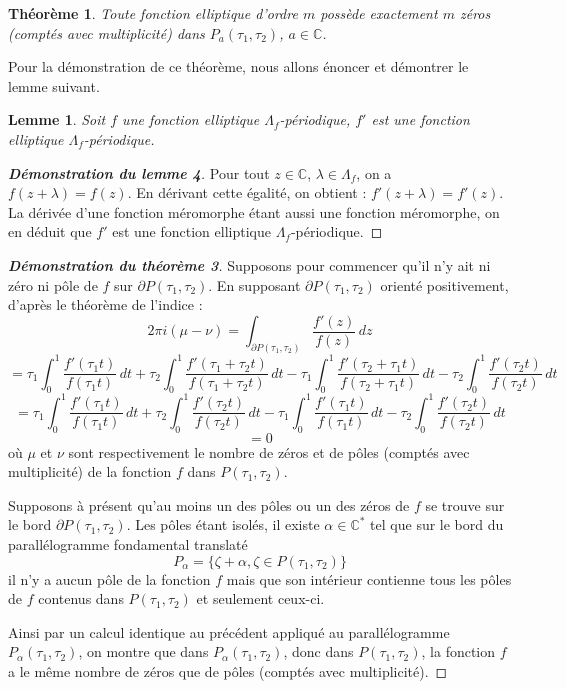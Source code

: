 \documentclass[12pt]{article}
\newtheorem{lemma}{Lemme}
\newtheorem{theorem}{Théorème}
\begin{document}
\begin{theorem}
    Toute fonction elliptique d'ordre \( m \) possède exactement \( m \) zéros (comptés avec multiplicité) dans \( P_{a}(\tau_1, \tau_2) \), \( a \in \mathbb{C} \).
    \end{theorem}
Pour la démonstration de ce théorème, nous allons énoncer et démontrer le lemme suivant.
    
    \begin{lemma}
    Soit \( f \) une fonction elliptique \( \Lambda_f \)-périodique, \( f' \) est une fonction elliptique \( \Lambda_f\)-périodique.
    \end{lemma}
    
    \begin{proof}[\textbf{Démonstration du lemme 4}]
    Pour tout \( z \in \mathbb{C} \), \( \lambda \in \Lambda_f \), on a \( f(z + \lambda) = f(z) \). En dérivant cette égalité, on obtient : \( f'(z + \lambda) = f'(z) \). La dérivée d'une fonction méromorphe étant aussi une fonction méromorphe, on en déduit que \( f' \) est une fonction elliptique \( \Lambda_f \)-périodique.
    \end{proof}
    
    \begin{proof}[\textbf{Démonstration du théorème 3}]
    Supposons pour commencer qu'il n'y ait ni zéro ni pôle de \( f \) sur \( \partial P(\tau_1, \tau_2) \). En supposant \( \partial P(\tau_1, \tau_2) \) orienté positivement, d'après le théorème de l'indice :
    \[
    2\pi i(\mu - \nu) = \int_{\partial P(\tau_1, \tau_2)} \frac{f'(z)}{f(z)} \, dz
    \]
    \[
    = \tau_1 \int_0^1 \frac{f'(\tau_1 t)}{f(\tau_1 t)} \, dt + \tau_2 \int_0^1 \frac{f'(\tau_1 + \tau_2 t)}{f(\tau_1 + \tau_2 t)} \, dt - \tau_1 \int_0^1 \frac{f'(\tau_2 + \tau_1 t)}{f(\tau_2 + \tau_1 t)} \, dt - \tau_2 \int_0^1 \frac{f'(\tau_2 t)}{f(\tau_2 t)} \, dt
    \]
    \[
    = \tau_1 \int_0^1 \frac{f'(\tau_1 t)}{f(\tau_1 t)} \, dt + \tau_2\int_0^1 \frac{f'( \tau_2 t)}{f( \tau_2 t)} \, dt - \tau_1\int_0^1 \frac{f'( \tau_1 t)}{f( \tau_1 t)} \, dt - \tau_2\int_0^1 \frac{f'(\tau_2 t)}{f(\tau_2 t)} \, dt
    \]
    \[
    = 0
    \]
    où \( \mu \) et \( \nu \) sont respectivement le nombre de zéros et de pôles (comptés avec multiplicité) de la fonction \( f \) dans \( P(\tau_1, \tau_2) \).
    
    Supposons à présent qu'au moins un des pôles ou un des zéros de \( f \) se trouve sur le bord \( \partial P(\tau_1, \tau_2) \). Les pôles étant isolés, il existe \( \alpha \in \mathbb{C}^* \) tel que sur le bord du parallélogramme fondamental translaté
    \[
    P_\alpha = \{\zeta + \alpha, \zeta \in P(\tau_1, \tau_2)\}
    \]
    il n'y a aucun pôle de la fonction \( f \) mais que son intérieur contienne tous les pôles de \( f \) contenus dans \( P(\tau_1, \tau_2) \) et seulement ceux-ci.
    
    Ainsi par un calcul identique au précédent appliqué au parallélogramme \( P_\alpha(\tau_1, \tau_2) \), on montre que dans \( P_\alpha(\tau_1, \tau_2) \), donc dans \( P(\tau_1, \tau_2) \), la fonction \( f \) a le même nombre de zéros que de pôles (comptés avec multiplicité).
    \end{proof}
\end{document}
